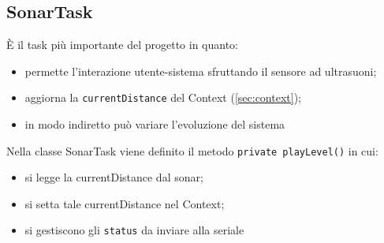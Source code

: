 \subsection{SonarTask}
È il task più importante del progetto in quanto:
\begin{itemize}
	\item permette l'interazione utente-sistema sfruttando il sensore ad ultrasuoni;
	\item aggiorna la \texttt{currentDistance} del Context (\ref{sec:context});
	\item in modo indiretto può variare l'evoluzione del sistema
\end{itemize}
Nella classe SonarTask viene definito il metodo \texttt{private playLevel()} in cui:
\begin{itemize}
	\item si legge la currentDistance dal sonar;
	\item si setta tale currentDistance nel Context;
	\item si gestiscono gli \texttt{status} da inviare alla seriale
\end{itemize}

